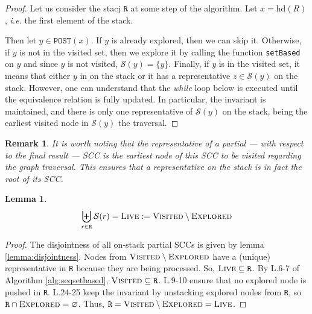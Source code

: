 \documentclass[a4 paper, 12pt]{article}
\newtheorem{lemma}{Lemma}
\newtheorem{remark}{Remark}
\begin{document}
\begin{proof}
    Let us consider the stacj $\texttt{R}$ at some step of the algorithm. Let $x = \text{hd}(R)$, \textit{i.e.} the first element of the stack.
    \BlankLine
    
    Then let $y \in \texttt{POST}(x)$. If $y$ is already explored, then we can skip it.
    \BlankLine
    Otherwise, if $y$ is not in the visited set, then we explore it by calling the function \texttt{setBased} on $y$ and since $y$ is not visited, $\mathcal{S}(y) = \{y\}$.
    \BlankLine
    Finally, if $y$ is in the visited set, it means that either $y$ in on the stack or it has a representative $z \in \mathcal{S}(y)$ on the stack. However, one can understand that the \textit{while} loop below is executed until the equivalence relation is fully updated. In particular, the invariant is maintained, and there is only one representative of $\mathcal{S}(y)$ on the stack, being the earliest visited node in $\mathcal{S}(y)$ the traversal.

\end{proof}

\begin{remark}\label{rem:rootSCC}
    It is worth noting that the representative of a partial — with respect to the final result — SCC is the earliest node of this SCC to be visited regarding the graph traversal. This ensures that a representative on the stack is in fact the root of its SCC.
\end{remark}

\begin{lemma}
    \begin{equation*}
        \biguplus_{r \in \texttt{R}} \mathcal{S}(r) = \textsc{Live} := \textsc{Visited} \setminus \textsc{Explored}
    \end{equation*}
\end{lemma}

\begin{proof}
    The disjointness of all on-stack partial SCCs is given by lemma \ref{lemma:disjointness}. Nodes from $\textsc{Visited} \setminus \textsc{Explored}$ have a (unique) representative in \texttt{R} because they are being processed. So, $\textsc{Live} \subseteq \texttt{R}$.
    \BlankLine
    By L.6-7 of Algorithm \ref{alg:seqsetbased}, $\textsc{Visited} \subseteq \texttt{R}$.
    L.9-10 ensure that no explored node is pushed in \texttt{R}.
    L.24-25 keep the invariant by unstacking explored nodes from \texttt{R}, so $\texttt{R} \cap \textsc{Explored} = \varnothing$. Thus, $\texttt{R} = \textsc{Visited} \setminus \textsc{Explored} = \textsc{Live}$.
\end{proof}
\end{document}
